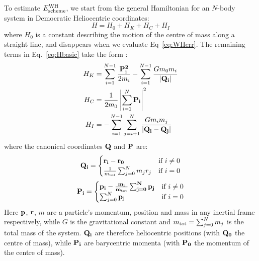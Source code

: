 To estimate  $E_{\rm scheme}^{\rm WH}$, we start from the general Hamiltonian for an $N$-body system in Democratic Heliocentric coordinates:
\begin{equation*}
H = H_0 + H_K + H_C + H_I
\label{eq:Hbasic}
\end{equation*}
where $H_0$ is a constant describing the motion of the centre of mass along a straight line, and disappears when we evaluate Eq~\ref{eq:WHerr}. 
The remaining terms in Eq.~\ref{eq:Hbasic} take the form \citep{Duncan1998}:
\begin{align}
H_K &= \sum_{i=1}^{N-1} \frac{\bf{P}_i^2}{2m_i} - \sum_{i=1}^{N-1} \frac{Gm_0m_i}{|\bf{Q_i}|} \label{eq:H_K}\\
H_C &= \frac{1}{2m_0} \left|\sum_{i=1}^{N} \bf{P}_i \right|^2 \label{eq:H_C}\\
H_I &= -\sum_{i=1}^{N-1}\sum_{j=i+1}^{N} \frac{Gm_im_j}{|\bf{Q}_i - \bf{Q}_j|}\label{eq:H_I}
\end{align}
where the canonical coordinates $\bf{Q}$ and $\bf{P}$ are:
\begin{equation}
\bf{Q}_i = \begin{cases}
\bf{r}_i - \bf{r}_0 & \text{if } i \ne 0\\
\frac{1}{m_{\rm tot}}\sum_{j=0}^{N}m_jr_j & \text{if } i = 0\\
\end{cases}
\end{equation}
\begin{equation}
\bf{P}_i = \begin{cases}
\bf{p}_i - \frac{m_i}{m_{\rm tot}} \sum_{j=0}^{N} \bf{p}_j & \text{if } i \ne 0\\
\sum_{j=0}^{N} \bf{p}_j & \text{if } i = 0\\
\end{cases}
\end{equation}
Here $\bf{p}$, $\bf{r}$, $m$ are a particle's momentum, position and mass in any inertial frame respectively, while $G$ is the gravitational constant and $m_{\rm tot} =  \sum_{j=0}^{N} m_j$ is the total mass of the system.
$\bf{Q}_i$ are therefore heliocentric positions (with $\bf{Q}_0$ the centre of mass), while $\bf{P}_i$ are barycentric momenta (with $\bf{P}_0$ the momentum of the centre of mass).

